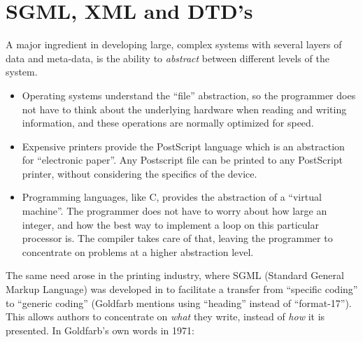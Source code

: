 
\chapter{SGML, XML and DTD's}
\label{cha:sgml-xml-and-dtd's}


A major ingredient in developing large, complex systems with several
layers of data and meta-data, is the ability to \textit{abstract}
between different levels of the system.

\begin{itemize}
\item

  Operating systems understand the ``file'' abstraction, so the
  programmer does not have to think about the underlying hardware when
  reading and writing information, and these operations are normally
  optimized for speed.

\item

  Expensive printers provide the PostScript language which is an
  abstraction for ``electronic paper''.  Any Postscript file can be
  printed to any PostScript printer, without considering the specifics
  of the device.
  
\item

  Programming languages, like C, provides the abstraction of a
  ``virtual machine''.  The programmer does not have to worry about
  how large an integer, and how the best way to implement a loop on
  this particular processor is.  The compiler takes care of that,
  leaving the programmer to concentrate on problems at a higher
  abstraction level.
  
\end{itemize}



The same need arose in the printing industry, where SGML (Standard
General Markup Language) was developed in
 to facilitate a transfer from ``specific coding''
to ``generic coding'' (Goldfarb mentions using ``heading'' instead of
``format-17'').  This allows authors to concentrate on \textit{what}
they write, instead of \textit{how} it is presented.  In Goldfarb's
own words in 1971:

